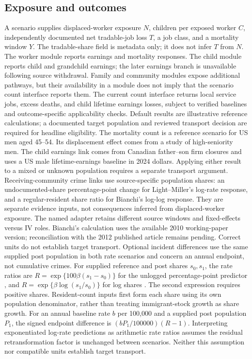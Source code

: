 \documentclass[10pt]{article}
\begin{document}
\subsection{Exposure and outcomes}
A scenario supplies displaced-worker exposure $N$, children per exposed
worker $C$, independently documented net tradable-job loss $T$, a job class, and a mortality window $Y$. The tradable-share field is metadata only; it does not infer $T$ from $N$.
The worker module reports earnings and mortality responses. The child
module reports child and grandchild earnings; the later earnings branch is unavailable following source withdrawal. Family and
community modules expose additional pathways, but their availability in
a module does not imply that the scenario count interface reports them.
The current count interface returns local service jobs, excess deaths,
and child lifetime earnings losses, subject to verified baselines and
outcome-specific applicability checks. Default results are illustrative
reference calculations; a documented target population and reviewed
transport decision are required for headline eligibility.
The mortality count is a reference scenario for US men aged 45--54. Its
displacement effect comes from a study of high-seniority men. The child
earnings link comes from Canadian father--son firm closures and uses a US
male lifetime-earnings baseline in 2024 dollars. Applying either result to
a mixed or unknown population requires a separate transport argument.
Receiving-community crime links use source-specific population shares:
an undocumented-share percentage-point change for Light--Miller's
log-rate response, and a regular-resident share ratio for Bianchi's
log-log response. They are separate evidence inputs, not consequences
inferred from displaced-worker exposure. The named adapter retains
different source windows and fixed-effects versus IV roles. Bianchi's
calculation uses the available 2010 working-paper version; reconciliation
with the 2012 published article remains pending. Correct units do not
establish target transport. Optional incident differences
use the same supplied post population in both rate scenarios and concern
an annual endpoint, not cumulative crimes.
For supplied reference and post shares $s_0,s_1$, the rate ratios are
$R=\exp\{100\beta(s_1-s_0)\}$ for the unlogged percentage-point
predictor \cite{lightmiller2018}, and
$R=\exp\{\beta\log(s_1/s_0)\}$ for log shares
\cite{bianchibuonannopinotti2012}. The second expression requires positive
shares. Resident-count inputs first form each share using its own population
denominator, rather than treating immigrant-stock growth as share growth.
For an annual baseline rate $b$ per 100,000 and a supplied post population
$P_1$, the signed endpoint difference is $(bP_1/100000)(R-1)$.
Interpreting exponentiated log-rate predictions as arithmetic rate ratios
assumes the residual retransformation factor is unchanged between scenarios.
Neither this assumption nor compatible units establish target transport.
\end{document}
